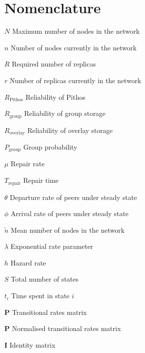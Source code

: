 \chapter{Nomenclature}

\newlength{\gnat}

\begin{Nomencl}[\gnat]

		\item[$N$]                      Maximum number of nodes in the network
        \item[$n$]                      Number of nodes currently in the network
        \item[$R$]                      Required number of replicas
        \item[$r$]                      Number of replicas currently in the network
        \item[$R_{\textrm{Pithos}}$]    Reliability of Pithos
        \item[$R_{\textrm{group}}$]     Reliability of group storage
        \item[$R_{\textrm{overlay}}$]   Reliability of overlay storage
        \item[$P_{\textrm{group}}$]     Group probability
        \item[$\mu$]                    Repair rate
        \item[$T_{\textrm{repair}}$]    Repair time
        \item[$\theta$]                 Departure rate of peers under steady state
        \item[$\phi$]                   Arrival rate of peers under steady state
        \item[$\tilde{n}$]              Mean number of nodes in the network
        \item[$\lambda$]                Exponential rate parameter
        \item[$h$]                      Hazard rate
        \item[$S$]                      Total number of states
        \item[$t_i$]                    Time spent in state $i$
        \item[$\textbf{P}$]             Transitional rates matrix
        \item[$\textbf{\^{P}}$]         Normalised transitional rates matrix
        \item[$\textbf{I}$]             Identity matrix

\end{Nomencl}
